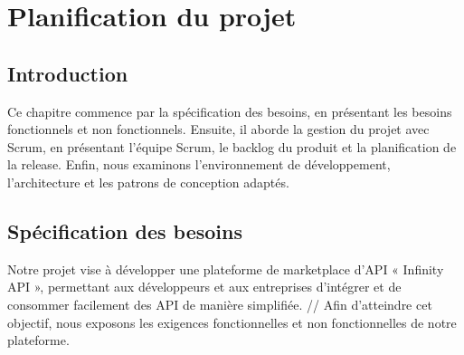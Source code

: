 \chapter{Planification du projet}

\section*{Introduction}
Ce chapitre commence par la spécification des besoins, en présentant les besoins fonctionnels et non fonctionnels. Ensuite, il aborde la gestion du projet avec Scrum, en présentant l'équipe Scrum, le backlog du produit et la planification de la release. Enfin, nous examinons l'environnement de développement, l'architecture et les patrons de conception adaptés.

\section{Spécification des besoins}

Notre projet vise à développer une plateforme de marketplace d'API « Infinity API », permettant aux développeurs et aux entreprises d'intégrer et de consommer facilement des API de manière simplifiée. //
Afin d'atteindre cet objectif, nous exposons les exigences fonctionnelles et non fonctionnelles de notre plateforme.

